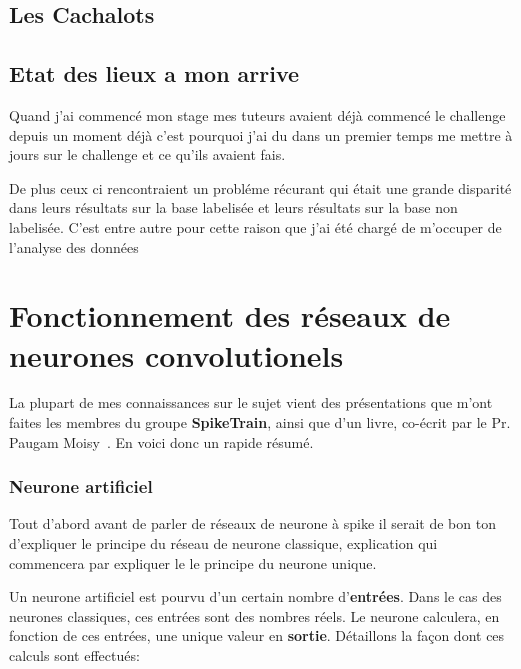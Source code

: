 

\subsection{Les Cachalots}
\label{Les Cachalots}

\subsection{Etat des lieux a mon arrive}
\label{Etat des lieux à mon arrivé}

Quand j'ai commencé mon stage mes tuteurs avaient déjà commencé le challenge depuis un moment déjà c'est pourquoi j'ai du dans un premier temps me mettre à jours sur le challenge et ce qu'ils avaient fais.


De plus ceux ci rencontraient un probléme récurant qui était une grande disparité dans leurs résultats sur la base labelisée et leurs résultats sur la base non labelisée.
C'est entre autre pour cette raison que j'ai été chargé de m'occuper de l'analyse des données

\section{Fonctionnement des réseaux de neurones convolutionels}

La plupart de mes connaissances sur le sujet vient des présentations que m'ont faites les membres du groupe \textbf{SpikeTrain}, ainsi que d'un livre, co-écrit par le Pr. Paugam Moisy~\cite{naturalHandbook}.
En voici donc un rapide résumé.

\subsubsection{Neurone artificiel}
\label{neuroneClassique}
Tout d'abord avant de parler de réseaux de neurone à spike il serait de bon ton d'expliquer le principe du réseau de neurone classique, explication qui commencera par expliquer le
le principe du neurone unique.

Un neurone artificiel est pourvu d'un certain nombre d'\textbf{entrées}. Dans le cas des neurones classiques, ces entrées sont des nombres réels. Le neurone calculera, en fonction de ces entrées, une unique valeur en \textbf{sortie}.
Détaillons la façon dont ces calculs sont effectués:

